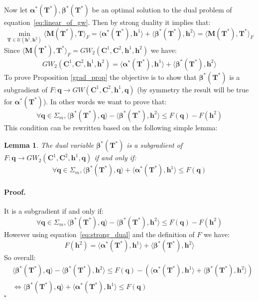 \documentclass{article}
\newcommand{\scalar}[2]{\langle #1 , #2 \rangle}
\def\eqref#1{equation~\ref{#1}}
\def\vh{{\bm{h}}}
\def\mM{{\bm{M}}}
\def\mT{{\bm{T}}}
\def\alphab{\boldsymbol\alpha}
\def\betab{\boldsymbol\beta}
\newcommand{\qbf}{\mathbf{q}}
\newcommand{\C}{\mathbf{C}}
\newcommand{\gw}{GW}
\newtheorem{lemma}{Lemma}
\begin{document}
	Now let $\alphab^{*}(\mT^{*}),\betab^{*}(\mT^{*})$ be an optimal solution to the dual problem of \eqref{eq:linear_of_gw}. Then by strong duality it implies that:
	\begin{equation}
	\min_{\mT \in \mathcal{U}(\vh^1,\vh^2)}\scalar{\mM(\mT^{*})}{\mT}_{F}=\scalar{\alphab^{*}(\mT^{*})}{\vh^1}+\scalar{\betab^{*}(\mT^{*})}{\vh^2}= \scalar{\mM(\mT^{*})}{\mT^{*}}_{F}
	\end{equation}
	Since $\scalar{\mM(\mT^{*})}{\mT^{*}}_{F}=\gw_2(\C^1,\C^2,\vh^1,\vh^2)$ we have:
	\begin{equation}\label{eq:strong_dual}
	\gw_2(\C^1,\C^2,\vh^1,\vh^2)=\scalar{\alphab^{*}(\mT^{*})}{\vh^1}+\scalar{\betab^{*}(\mT^{*})}{\vh^2}
	\end{equation}
	To prove Proposition \ref{grad_prop} the objective is to show that $\betab^{*}(\mT^{*})$ is a subgradient of $F:\qbf \rightarrow \gw(\C^1,\C^2,\vh^1,\qbf)$ (by symmetry the result will be true for $\alphab^{*}(\mT^{*})$). In other words we want to prove that:
	\begin{equation}
	\forall \qbf \in \Sigma_m, \scalar{\betab^{*}(\mT^{*})}{\qbf}-\scalar{\betab^{*}(\mT^{*})}{\vh^2}\leq F(\qbf)-F(\vh^2)
	\end{equation}
	This condition can be rewritten based on the following simple lemma:
	\begin{lemma}
		\label{lemmaone}
		The dual variable $\betab^{*}(\mT^{*})$ is a subgradient of $F: \qbf \rightarrow \gw_2(\C^1,\C^2,\vh^1,\qbf)$ if and only if:
		\begin{equation}
		\forall \qbf \in \Sigma_m, \scalar{\betab^{*}(\mT^{*})}{\qbf}{}+\scalar{\alphab^{*}(\mT^{*})}{\vh^1}{}\leq F(\qbf)
		\end{equation}
	\end{lemma}
	
	\paragraph{Proof.}
	It is a subgradient if and only if:
	\begin{equation}
	\forall \qbf \in \Sigma_m, \scalar{\betab^{*}(\mT^{*})}{\qbf}{}-\scalar{\betab^{*}(\mT^{*})}{\vh^2}{}\leq F(\qbf)-F(\vh^2)
	\end{equation}
	However using \eqref{eq:strong_dual} and the definition of $F$ we have:
	\begin{equation}
	\label{eq:strong_dual_F}
	F(\vh^2)=\scalar{\alphab^{*}(\mT^{*})}{\vh^1}{}+\scalar{\betab^{*}(\mT^{*})}{\vh^2}{}
	\end{equation}
	So overall:
	\begin{equation}
	\begin{split}
	&\scalar{\betab^{*}(\mT^{*})}{\qbf}{}-\scalar{\betab^{*}(\mT^{*})}{\vh^2}{} \leq F(\qbf)-(\scalar{\alphab^{*}(\mT^{*})}{\vh^1}{}+\scalar{\betab^{*}(\mT^{*})}{\vh^2}{}) \\ 
	&\iff \scalar{\betab^{*}(\mT^{*})}{\qbf}{}+\scalar{\alphab^{*}(\mT^{*})}{\vh^1}{}\leq F(\qbf)
	\end{split}
	\end{equation}
	$\square$
	
\end{document}
